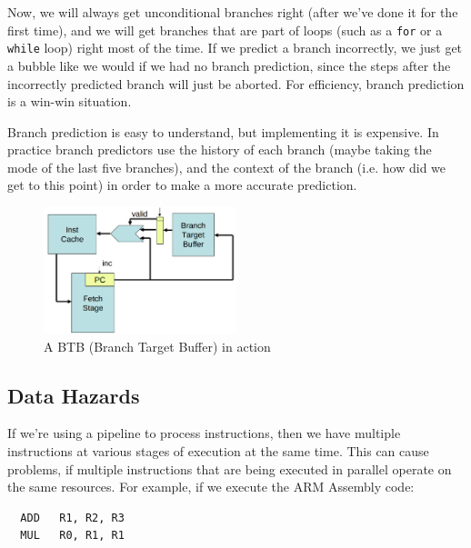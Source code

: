 Now, we will always get unconditional branches right (after we've done it for
the first time), and we will get branches that are part of loops (such as a
\texttt{for} or a \texttt{while} loop) right most of the time. If we predict a
branch incorrectly, we just get a bubble like we would if we had no branch
prediction, since the steps after the incorrectly predicted branch will just
be aborted. For efficiency, branch prediction is a win-win situation.

Branch prediction is easy to understand, but implementing it is expensive. In
practice branch predictors use the history of each branch (maybe taking the mode
of the last five branches), and the context of the branch (i.e. how did we get
to this point) in order to make a more accurate prediction.

\begin{figure}[ht]
  \centering
  \includegraphics[width=0.5\textwidth]{images/branch-target-buffer}
  \caption{A BTB (Branch Target Buffer) in action}
  \label{branch-target-buffer}
\end{figure}

\subsection{Data Hazards}

If we're using a pipeline to process instructions, then we have multiple
instructions at various stages of execution at the same time. This can cause
problems, if multiple instructions that are being executed in parallel operate
on the same resources. For example, if we execute the ARM Assembly code:

\begin{verbatim}
  ADD   R1, R2, R3
  MUL   R0, R1, R1
\end{verbatim}



